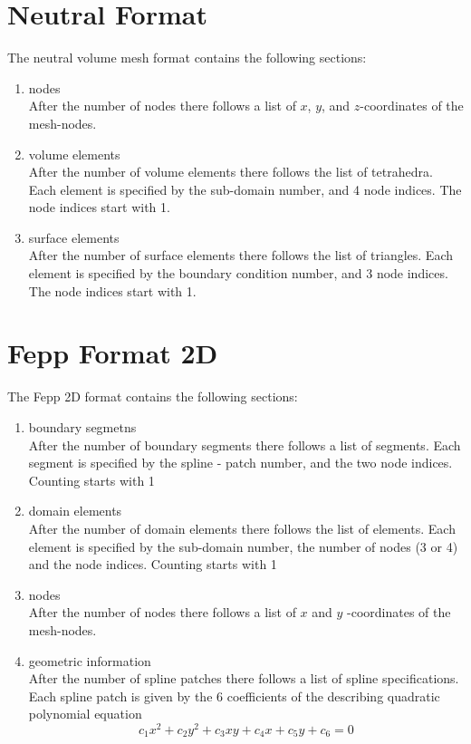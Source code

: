 \documentclass[12pt]{book}
\begin{document}
\section{Neutral Format}
The neutral volume mesh format contains the following sections:

\begin{enumerate}
\item
nodes \\
After the number of nodes there follows a list of $x$, $y$, 
and $z$-coordinates of the mesh-nodes.
\item
volume elements \\
After the number of volume elements there follows the list of tetrahedra.
Each element is specified by the sub-domain number, and 4 node indices. The
node indices start with 1.
\item
surface elements \\ 
After the number of surface elements there follows
the list of triangles.  Each element is specified by the boundary
condition number, and 3 node indices. The node indices start with 1.
\end{enumerate}



\section{Fepp Format 2D}
The Fepp 2D format contains the following sections:

\begin{enumerate}
\item
boundary segmetns \\
After the number of boundary segments there follows a list of 
segments. Each segment is specified by the spline - patch number,
and the two node indices. Counting starts with 1
\item
domain elements \\
After the number of domain elements there follows the list of elements.
Each element is specified by the sub-domain number, the number of nodes (3 or 4) and the node indices. Counting starts with 1
\item
nodes \\
After the number of nodes there follows a list of $x$ and $y$ 
-coordinates of the mesh-nodes.
\item
geometric information \\
After the number of spline patches there follows a list of spline specifications. Each spline patch is given by the 6 coefficients of the describing 
quadratic polynomial equation
$$
c_1 x^2 + c_2 y^2 + c_3 xy + c_4 x + c_5 y + c_6 = 0
$$
\end{enumerate}
\end{document}
